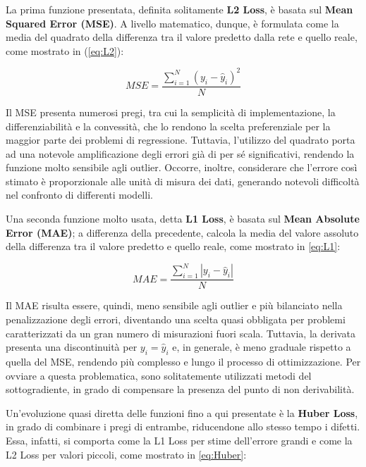La prima funzione presentata, definita solitamente \textbf{L2 Loss}, è basata sul \textbf{Mean Squared Error (MSE)}. A livello matematico, dunque, è formulata come la media del quadrato della differenza tra il valore predetto dalla rete e quello reale, come mostrato in (\ref{eq:L2}):

        \begin{equation}
            MSE = \displaystyle \frac{\sum_{i=1}^{N} (y_i - \hat{y}_i)^2}{N}
            \label{eq:L2}
        \end{equation}

Il MSE presenta numerosi pregi, tra cui la semplicità di implementazione, la differenziabilità e la convessità, che lo rendono la scelta preferenziale per la maggior parte dei problemi di regressione. Tuttavia, l'utilizzo del quadrato porta ad una notevole amplificazione degli errori già di per sé significativi, rendendo la funzione molto sensibile agli outlier. Occorre, inoltre, considerare che l'errore così stimato è proporzionale alle unità di misura dei dati, generando notevoli difficoltà nel confronto di differenti modelli.

Una seconda funzione molto usata, detta \textbf{L1 Loss}, è basata sul \textbf{Mean Absolute Error (MAE)}; a differenza della precedente, calcola la media del valore assoluto della differenza tra il valore predetto e quello reale, come mostrato in \ref{eq:L1}:

        \begin{equation}
            MAE = \displaystyle \frac{\sum_{i=1}^{N} |y_i - \hat{y}_i|}{N}
            \label{eq:L1}
        \end{equation}

Il MAE risulta essere, quindi, meno sensibile agli outlier e più bilanciato nella penalizzazione degli errori, diventando una scelta quasi obbligata per problemi caratterizzati da un gran numero di misurazioni fuori scala. Tuttavia, la derivata presenta una discontinuità per $y_{i} = \hat{y}_{i}$ e, in generale, è meno graduale rispetto a quella del MSE, rendendo più complesso e lungo il processo di ottimizzazione. Per ovviare a questa problematica, sono solitatemente utilizzati metodi del sottogradiente, in grado di compensare la presenza del punto di non derivabilità.

Un'evoluzione quasi diretta delle funzioni fino a qui presentate è la \textbf{Huber Loss}, in grado di combinare i pregi di entrambe, riducendone allo stesso tempo i difetti. Essa, infatti, si comporta come la L1 Loss per stime dell'errore grandi e come la L2 Loss per valori piccoli, come mostrato in \ref{eq:Huber}:

